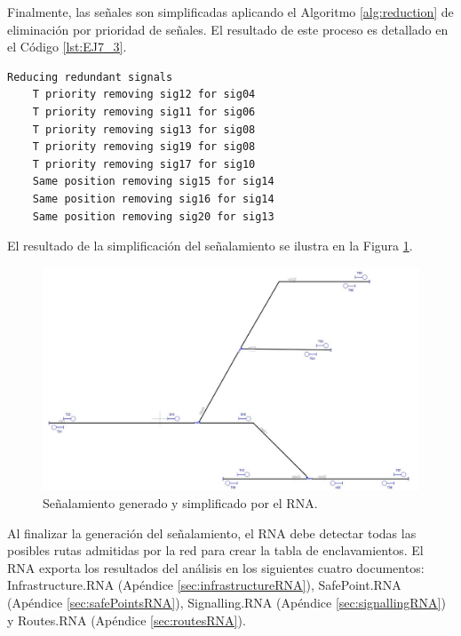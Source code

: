 	Finalmente, las señales son simplificadas aplicando el Algoritmo \ref{alg:reduction} de eliminación por prioridad de señales. El resultado de este proceso es detallado en el Código \ref{lst:EJ7_3}.
	
	\begin{lstlisting}[language = {}, caption = Reducción de señalamiento por prioridad de señales, label = {lst:EJ7_3}]
	Reducing redundant signals
	T priority removing sig12 for sig04
	T priority removing sig11 for sig06
	T priority removing sig13 for sig08
	T priority removing sig19 for sig08
	T priority removing sig17 for sig10
	Same position removing sig15 for sig14
	Same position removing sig16 for sig14
	Same position removing sig20 for sig13
	\end{lstlisting}
	
	El resultado de la simplificación del señalamiento se ilustra en la Figura \ref{fig:EJ7_7}.
	
	\begin{figure}[H]
		\centering
		\includegraphics[width=1\textwidth]{resultados-obtenidos/ejemplo7/images/7_RNA.png}
		\centering\caption{Señalamiento generado y simplificado por el RNA.}
		\label{fig:EJ7_7}
	\end{figure}
	
	Al finalizar la generación del señalamiento, el RNA debe detectar todas las posibles rutas admitidas por la red para crear la tabla de enclavamientos. El RNA exporta los resultados del análisis en los siguientes cuatro documentos: Infrastructure.RNA (Apéndice \ref{sec:infrastructureRNA}), SafePoint.RNA (Apéndice \ref{sec:safePointsRNA}), Signalling.RNA (Apéndice \ref{sec:signallingRNA}) y Routes.RNA (Apéndice \ref{sec:routesRNA}).